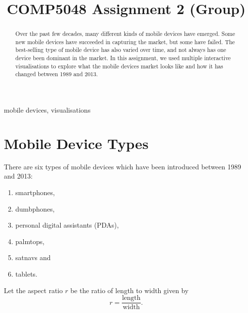 \documentclass[conference]{IEEEtran}
\begin{document}
\title{COMP5048 Assignment 2 (Group)}

\author{
\and
{}
\and
{}
\and
{}
\and
{}
}

\maketitle

\begin{abstract}
Over the past few decades, many different kinds of mobile devices have emerged. Some new mobile devices have succeeded in capturing the market, but some have failed. The best-selling type of mobile device has also varied over time, and not always has one device been dominant in the market. In this assignment, we used multiple interactive visualisations to explore what the mobile devices market looks like and how it has changed between 1989 and 2013.
\end{abstract}

\begin{IEEEkeywords}
mobile devices, visualisations
\end{IEEEkeywords}

\section{Mobile Device Types}
\label{sec:A}

There are six types of mobile devices which have been introduced between 1989
and 2013:
\begin{enumerate}
	\item smartphones,
	\item dumbphones,
	\item personal digital assistants (PDAs),
	\item palmtops,
	\item satnavs and
	\item tablets.
\end{enumerate}

Let the aspect ratio $r$ be the ratio of length to width given by
\[ r = \frac{\text{length}}{\text{width}}. \]
\end{document}
